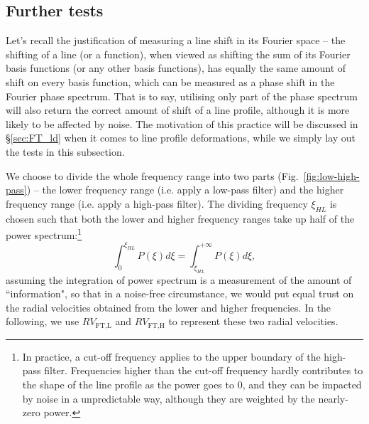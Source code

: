 
\subsection{Further tests}
\label{sec:Further_tests}

Let's recall the justification of measuring a line shift in its Fourier space -- the shifting of a line (or a function), when viewed as shifting the sum of its Fourier basis functions (or any other basis functions), has equally the same amount of shift on every basis function, which can be measured as a phase shift in the Fourier phase spectrum. That is to say, utilising only part of the phase spectrum will also return the correct amount of shift of a line profile, although it is more likely to be affected by noise. The motivation of this practice will be discussed in \S\ref{sec:FT_ld} when it comes to line profile deformations, while we simply lay out the tests in this subsection. 

We choose to divide the whole frequency range into two parts (Fig.~\ref{fig:low-high-pass}) -- the lower frequency range (i.e. apply a low-pass filter) and the higher frequency range (i.e. apply a high-pass filter). The dividing frequency $\xi_{HL}$ is chosen such that both the lower and higher frequency ranges take up half of the power spectrum:\footnote{In practice, a cut-off frequency applies to the upper boundary of the high-pass filter. Frequencies higher than the cut-off frequency hardly contributes to the shape of the line profile as the power goes to 0, and they can be impacted by noise in a unpredictable way, although they are weighted by the nearly-zero power.}
\begin{equation}
	\int_{0}^{\xi_{HL}} P(\xi) d\xi = \int_{\xi_{HL}}^{+\infty} P(\xi) d\xi, 
\end{equation}
assuming the integration of power spectrum is a measurement of the amount of ``information", so that in a noise-free circumstance, we would put equal trust on the radial velocities obtained from the lower and higher frequencies. In the following, we use $RV_\text{FT,L}$ and $RV_\text{FT,H}$ to represent these two radial velocities.

